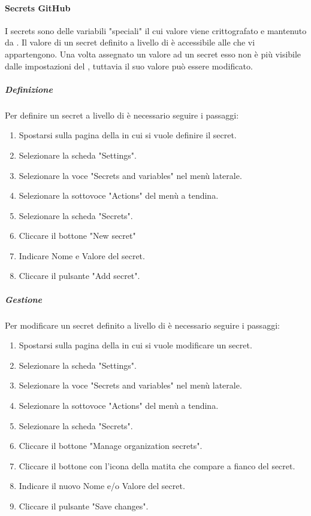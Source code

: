 \paragraph{Secrets GitHub}
I secrets sono delle variabili "speciali" il cui valore viene crittografato e mantenuto da .
Il valore di un secret definito a livello di  è accessibile alle  che vi appartengono.
Una volta assegnato un valore ad un secret esso non è più visibile dalle impostazioni del , tuttavia il suo valore può essere modificato.

\subparagraph{Definizione}
Per definire un secret a livello di  è necessario seguire i passaggi:
\begin{enumerate}
    \item Spostarsi sulla pagina della  in cui si vuole definire il secret.
    \item Selezionare la scheda "Settings".
    \item Selezionare la voce "Secrets and variables" nel menù laterale.
    \item Selezionare la sottovoce "Actions" del menù a tendina.
    \item Selezionare la scheda "Secrets".
    \item Cliccare il bottone "New  secret" 
    \item Indicare Nome e Valore del secret.
    \item Cliccare il pulsante "Add secret".
\end{enumerate}

\subparagraph{Gestione}
Per modificare un secret definito a livello di  è necessario seguire i passaggi:
\begin{enumerate}
    \item Spostarsi sulla pagina della  in cui si vuole modificare un secret.
    \item Selezionare la scheda "Settings".
    \item Selezionare la voce "Secrets and variables" nel menù laterale.
    \item Selezionare la sottovoce "Actions" del menù a tendina.
    \item Selezionare la scheda "Secrets".
    \item Cliccare il bottone "Manage organization secrets".
    \item Cliccare il bottone con l'icona della matita che compare a fianco del secret.
    \item Indicare il nuovo Nome e/o Valore del secret.
    \item Cliccare il pulsante "Save changes".
\end{enumerate}

